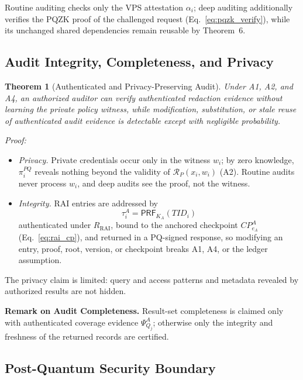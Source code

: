 \documentclass[lettersize,journal]{IEEEtran}
\newtheorem{theorem}{Theorem}
\begin{document}
Routine auditing checks only the VPS attestation $\alpha_i$; deep
auditing additionally verifies the PQZK proof of the challenged request
(Eq.~\eqref{eq:pqzk_verify}), while its unchanged shared dependencies
remain reusable by Theorem~6.

\subsection{Audit Integrity, Completeness, and Privacy}

\begin{theorem}[Authenticated and Privacy-Preserving Audit]
Under A1, A2, and A4, an authorized auditor can verify authenticated
redaction evidence without learning the private policy witness, while
modification, substitution, or stale reuse of authenticated audit
evidence is detectable except with negligible probability.
\end{theorem}

\emph{Proof:}
\begin{itemize}[leftmargin=*,nosep]
\item \emph{Privacy.} Private credentials occur only in the witness
$w_i$; by zero knowledge, $\pi_i^{PQ}$ reveals nothing beyond the
validity of $\mathcal{R}_P(x_i,w_i)$ (A2). Routine audits never process
$w_i$, and deep audits see the proof, not the witness.
\item \emph{Integrity.} RAI entries are addressed by
\begin{equation}
\tau_i^A=\mathsf{PRF}_{K_A}(TID_i)
\end{equation}
authenticated under $R_{\mathrm{RAI}}$, bound to the anchored checkpoint
$CP_{e_A}^A$ (Eq.~\eqref{eq:rai_cp}), and returned in a PQ-signed
response, so modifying an entry, proof, root, version, or checkpoint
breaks A1, A4, or the ledger assumption.
\end{itemize}
The privacy claim is limited: query and access patterns and metadata
revealed by authorized results are not hidden.

\medskip
\noindent\textbf{Remark on Audit Completeness.}
Result-set completeness is claimed only with authenticated coverage
evidence $\Psi_{Q_j}^{A}$; otherwise only the integrity and freshness of
the returned records are certified.

\subsection{Post-Quantum Security Boundary}
\end{document}
